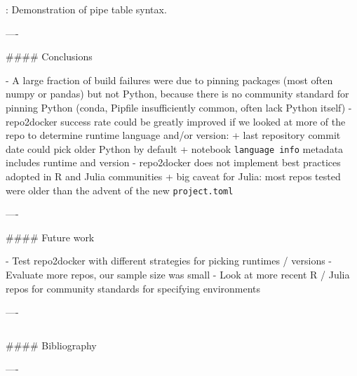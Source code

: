 \documentclass{beamer}
\begin{document}
\begin{frame}[fragile]
\begin{columns}[T]
\begin{column}{.46\textwidth}
\begin{markdown}
  : Demonstration of pipe table syntax.

----

#### Conclusions

- A large fraction of build failures were due to pinning packages (most often numpy or pandas)
  but not Python, because there is no community standard for pinning Python (conda, Pipfile insufficiently common, often lack Python itself)
- repo2docker success rate could be greatly improved if we looked at more of the repo to determine runtime language and/or version:
    + last repository commit date could pick older Python by default
    + notebook \texttt{language info} metadata includes runtime and version
- repo2docker does not implement best practices adopted in R and Julia communities
    + big caveat for Julia: most repos tested were older than the advent of the new \texttt{project.toml}

----

#### Future work

- Test repo2docker with different strategies for picking runtimes / versions
- Evaluate more repos, our sample size was small
- Look at more recent R / Julia repos for community standards for specifying environments

----

\end{markdown}
\end{column}
\end{columns}

\begin{markdown}


#### Bibliography




----

\end{markdown}

\end{frame}
\end{document}
